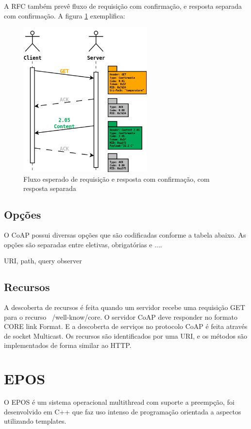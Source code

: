 A RFC tamb\'em prev\^e fluxo de requisi\c{c}\~ao com confirma\c{c}\~ao, e resposta separada com confirma\c{c}\~ao. A figura \ref{separateResponse} exemplifica:

\begin{figure}[h]
   \label{separateResponse}
   \centering
   \includegraphics[width=0.6\textwidth]{figuras/separateresponse.png}
   \caption{Fluxo esperado de requisi\c{c}\~ao e resposta com confirma\c{c}\~ao, com resposta separada}
\end{figure}

\subsection{Op\c{c}\~oes}

O CoAP possui diversas op\c{c}\~oes que s\~ao codificadas conforme a tabela abaixo.
As op\c{c}\~oes s\~ao separadas entre eletivas, obrigat\'orias e ....

URI, path, query
observer


\subsection{Recursos}
A descoberta de recursos \'e feita quando um servidor recebe uma requisi\c{c}\~ao GET para o recurso ~/well-know/core. O servidor CoAP deve responder no formato CORE link Format.\cite{rfc6690} E a descoberta de servi\c{c}os no protocolo CoAP \'e feita atrav\'es de socket Multicast. Os recursos s\~ao identificados por uma URI, e os m\'etodos s\~ao implementados de forma similar ao HTTP.  
\section{EPOS}
O EPOS \'e um sistema operacional multithread com suporte a preemp\c{c}\~ao, foi desenvolvido em C++ que faz uso intenso de programa\c{c}\~ao orientada a aspectos utilizando templates.

